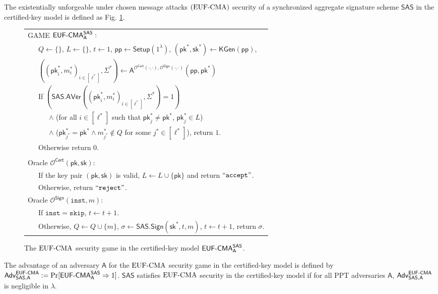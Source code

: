 \documentclass[a4paper,11pt]{fullverllncs}
\newcommand{\A}{\mathsf{A}}
\newcommand{\Adv}{\mathsf{Adv}}
\newcommand{\Inst}{\mathtt{inst}}
\newcommand{\instskip}{\mathtt{skip}}
\newcommand{\accept}{\mathtt{accept}}
\newcommand{\reject}{\mathtt{reject}}
\newcommand{\sk}{\mathsf{sk}}
\newcommand{\pk}{\mathsf{pk}}
\newcommand{\pp}{\mathsf{pp}}
\newcommand{\Setup}{\mathsf{Setup}}
\newcommand{\KGen}{\mathsf{KGen}}
\newcommand{\Sign}{\mathsf{Sign}}
\newcommand{\EUFCMA}{\mathsf{EUF \mathchar`- CMA}}
\newcommand{\rmEUFCMA}{\mathrm{EUF}\mathchar`-\mathrm{CMA}}
\newcommand{\Cert}{\mathsf{Cert}}
\newcommand{\SAS}{\mathsf{SAS}}
\newcommand{\SASSign}{\mathsf{SAS.Sign}}
\newcommand{\SASAVer}{\mathsf{SAS.AVer}}
\begin{document}
\begin{definition}
The existentially unforgeable under chosen message attacks $(\rmEUFCMA)$ security of a synchronized aggregate signature scheme $\SAS$ in the certified-key model is defined as Fig. \ref{SASEUFCMAgame}.

\begin{figure}[h]
\centering
\begin{tabular}{|l|}
\hline
GAME $\EUFCMA^{\SAS}_{\A}:$\\
~~~$Q \leftarrow \{\}$, $L \leftarrow  \{\}$, $t \leftarrow 1$, $\pp \leftarrow \Setup (1^{\lambda})$, $(\pk^*, \sk^*) \leftarrow \KGen(\pp)$, \\
~~~$((\pk^*_i, m^*_i)_{i \in [\ell^*]}, \Sigma^*) \leftarrow \A^{\mathcal{O}^{\Cert}(\cdot, \cdot), \mathcal{O}^{\Sign}(\cdot, \cdot)}(\pp, \pk^*)$\\
~~~If $(\SASAVer((\pk^*_i, m^*_i)_{i \in [\ell^*]}, \Sigma^*) = 1)$\\
~~~~~~$\land$ (for all  $i \in [\ell^*]$  such  that $\pk^*_j \neq \pk^*$, $\pk^*_j \in L$)\\
~~~~~~$\land$ ($\pk^*_{j^*} = \pk^* \land m^*_{j^*} \notin Q$ for some $j^* \in [\ell^*]$), return $1$.\\
~~~Otherwise return $0$.\\
\\
Oracle $\mathcal{O}^{\Cert}(\pk, \sk):$\\
~~~If the key pair $(\pk, \sk)$ is valid, $L \leftarrow L \cup \{\pk\}$ and return $``\accept"$.\\
~~~Otherwise, return $``\reject"$.\\
Oracle $\mathcal{O}^{\Sign}(\Inst, m):$\\
~~~If $\Inst = \instskip$, $t \leftarrow t+1$.\\
~~~Otherwise, $Q \leftarrow Q \cup \{m\}$, $\sigma \leftarrow\SASSign (\sk^*, t, m)$, $t \leftarrow t+1$, return $\sigma$.\\

\hline
\end{tabular}
\caption{\small
The $\rmEUFCMA$ security game in the certified-key model $\EUFCMA^{\SAS}_{\A}$.}
\label{SASEUFCMAgame}
\end{figure}


The advantage of an adversary $\A$ for the $\rmEUFCMA$ security game in the certified-key model is defined by $\Adv^{\EUFCMA}_{\SAS, \A}:= \Pr[\EUFCMA^{\SAS}_{\A} \Rightarrow 1]$.
$\SAS$ satisfies $\rmEUFCMA$ security in the certified-key model if for all PPT adversaries $\A$, $\Adv^{\EUFCMA}_{\SAS, \A}$ is negligible in $\lambda$.


\end{definition}
\end{document}
